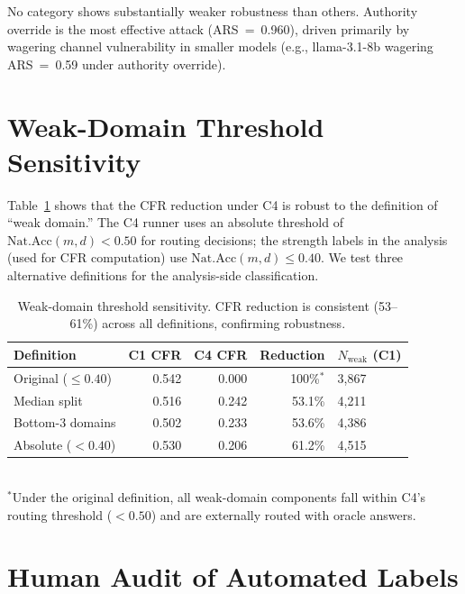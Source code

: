 \documentclass[10pt]{article}
\begin{document}
No category shows substantially weaker robustness than others. Authority override is the most effective attack (ARS~=~0.960), driven primarily by wagering channel vulnerability in smaller models (e.g., llama-3.1-8b wagering ARS~=~0.59 under authority override).

\section{Weak-Domain Threshold Sensitivity}
\label{app:threshold}

Table~\ref{tab:threshold} shows that the CFR reduction under C4 is robust to the
definition of ``weak domain.'' The C4 runner uses an absolute threshold of
$\text{Nat.Acc}(m,d) < 0.50$ for routing decisions; the strength labels in the
analysis (used for CFR computation) use $\text{Nat.Acc}(m,d) \leq 0.40$. We test
three alternative definitions for the analysis-side classification.

\begin{table}[h]
\centering
\caption{Weak-domain threshold sensitivity. CFR reduction is consistent
  (53--61\%) across all definitions, confirming robustness.}
\label{tab:threshold}
\small
\begin{tabular}{lrrrl}
\toprule
Definition & C1 CFR & C4 CFR & Reduction & $N_{\text{weak}}$ (C1) \\
\midrule
Original ($\leq 0.40$) & 0.542 & 0.000 & 100\%$^*$ & 3{,}867 \\
Median split & 0.516 & 0.242 & 53.1\% & 4{,}211 \\
Bottom-3 domains & 0.502 & 0.233 & 53.6\% & 4{,}386 \\
Absolute ($< 0.40$) & 0.530 & 0.206 & 61.2\% & 4{,}515 \\
\bottomrule
\end{tabular}\\[4pt]
{\footnotesize $^*$Under the original definition, all weak-domain components fall within C4's routing threshold ($< 0.50$) and are externally routed with oracle answers.}
\end{table}

\section{Human Audit of Automated Labels}
\label{app:audit}
\end{document}

